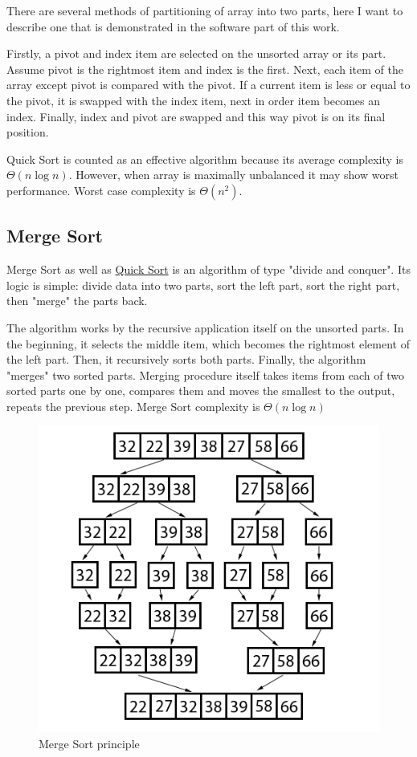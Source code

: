 \documentclass[
  field=inf,
  biblatex,
  language=english,
  glossaries,
  theorems=false,
  sourcecodes=false,
  index
]{kidiplom}
\begin{document}
There are several methods of partitioning of array into two parts, here I want to describe one that is demonstrated in the software part of this work.

Firstly, a pivot and index item are selected on the unsorted array or its part. Assume pivot is the rightmost item and index is the first. Next, each item of the array except pivot is compared with the pivot. If a current item is less or equal to the pivot, it is swapped with the index item, next in order item becomes an index. Finally, index and pivot are swapped and this way pivot is on its final position.

Quick Sort is counted as an effective algorithm because its average complexity is $\Theta(n \log n)$. However, when array is maximally unbalanced it may show worst performance. Worst case complexity is $\Theta(n^2)$.

\subsection{Merge Sort}

Merge Sort as well as \hyperref[sec:quicksort]{Quick Sort} is an algorithm of type "divide and conquer". Its logic is simple: divide data into two parts, sort the left part, sort the right part, then "merge" the parts back.

The algorithm works by the recursive application itself on the unsorted parts. In the beginning, it selects the middle item, which becomes the rightmost element of the left part. Then, it recursively sorts both parts. Finally, the algorithm "merges" two sorted parts. Merging procedure itself takes items from each of two sorted parts one by one, compares them and moves the smallest to the output, repeats the previous step. Merge Sort complexity is $\Theta(n \log n)$

\begin{figure}[H]
\begin{center}
	
	\includegraphics[scale=2.5]{img/Mergesort.png}
	\caption{Merge Sort principle}\label{fig:insert}
\end{center}
\end{figure}
\end{document}
